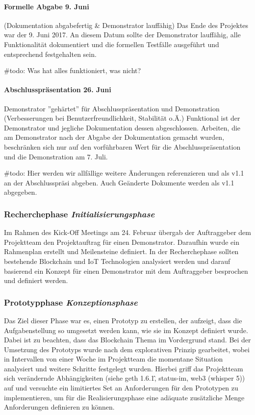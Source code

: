 \paragraph{Formelle Abgabe 9. Juni}
(Dokumentation abgabefertig \& Demonstrator lauffähig) Das Ende des Projektes war der 9. Juni 2017. An diesem Datum sollte der Demonstrator lauffähig, alle Funktionalität dokumentiert und die formellen Testfälle ausgeführt und entsprechend festgehalten sein. 

\#todo: Was hat alles funktioniert, was nicht?

\paragraph{Abschlusspräsentation 26. Juni}
Demonstrator ''gehärtet'' für Abschlusspräsentation und Demonstration (Verbesserungen bei Benutzerfreundlichkeit, Stabilität o.Ä.)
Funktional ist der Demonstrator und jegliche Dokumentation dessen abgeschlossen. Arbeiten, die am Demonstrator nach der Abgabe der Dokumentation gemacht wurden, beschränken sich nur auf den vorführbaren Wert für die Abschlusspräsentation und die Demonstration am 7. Juli.

\#todo: Hier werden wir allfällige weitere Änderungen referenzieren und als v1.1 an der Abschlusspräsi abgeben. Auch Geänderte Dokumente werden als v1.1 abgegeben.

\subsubsection{Recherchephase \emph{Initialisierungsphase}}
\label{pm_subsubsec:Recherchephase}
Im Rahmen des Kick-Off Meetings am 24. Februar übergab der Auftraggeber dem Projektteam den Projektauftrag für einen Demonstrator. Daraufhin wurde ein Rahmenplan erstellt und Meilensteine definiert. In der Recherchephase sollten bestehende Blockchain und IoT Technologien analysiert werden und darauf basierend ein Konzept für einen Demonstrator mit dem Auftraggeber besprochen und definiert werden.

\subsubsection{Prototypphase \emph{Konzeptionsphase}}
\label{pm_subsubsec:Prototypphase}
Das Ziel dieser Phase war es, einen Prototyp zu erstellen, der aufzeigt, dass die Aufgabenstellung so umgesetzt werden kann, wie sie im Konzept definiert wurde. Dabei ist zu beachten, dass das Blockchain Thema im Vordergrund stand. Bei der Umsetzung des Prototyps wurde nach dem explorativen Prinzip gearbeitet, wobei in Intervallen von einer Woche im Projektteam die momentane Situation analysiert und weitere Schritte festgelegt wurden. Hierbei griff das Projektteam sich verändernde Abhängigkeiten (siehe geth 1.6.1\^, status-im, web3 (whisper 5)) auf und versuchte ein limitiertes Set an Anforderungen für den Prototypen zu implementieren, um für die Realisierungsphase eine adäquate zusätzliche Menge Anforderungen definieren zu können.

